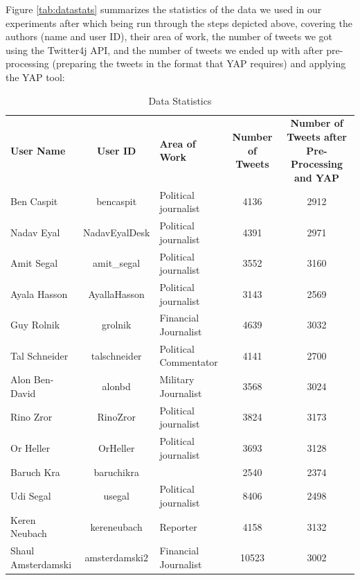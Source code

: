 \documentclass[a4paper]{article}
\begin{document}
Figure \ref{tab:datastats} summarizes the statistics of the data we used in our experiments after which being run through the steps depicted above, covering the authors (name and user ID), their area of work, the number of tweets we got using the Twitter4j API, and the number of tweets we ended up with after pre-processing (preparing the tweets in the format that YAP requires) and applying the YAP tool:\\
\begin{table}[htbp]
  \centering
  \caption{Data Statistics}
    \begin{tabular}{lcp{5.715em}cc}
    \textbf{User Name} & \multicolumn{1}{p{7.57em}}{\textbf{User ID}} & \textbf{Area of Work} & \multicolumn{1}{p{5.57em}}{\textbf{Number of Tweets}} & \multicolumn{1}{p{12.855em}}{\textbf{Number of Tweets after Pre-Processing and YAP}} \\
    Ben Caspit & \multicolumn{1}{p{7.57em}}{bencaspit} & Political journalist & 4136  & 2912 \\
    Nadav Eyal & \multicolumn{1}{p{7.57em}}{NadavEyalDesk} & Political journalist & 4391  & 2971 \\
    Amit Segal & \multicolumn{1}{p{7.57em}}{amit\_segal} & Political journalist & 3552  & 3160 \\
    Ayala Hasson & \multicolumn{1}{p{7.57em}}{AyallaHasson} & Political journalist & 3143  & 2569 \\
    Guy Rolnik & \multicolumn{1}{p{7.57em}}{grolnik} & Financial Journalist & 4639  & 3032 \\
    Tal Schneider & \multicolumn{1}{p{7.57em}}{talschneider} & Political Commentator & 4141  & 2700 \\
    Alon Ben-David & \multicolumn{1}{p{7.57em}}{alonbd} & Military Journalist & 3568  & 3024 \\
    Rino Zror & \multicolumn{1}{p{7.57em}}{RinoZror} & Political journalist & 3824  & 3173 \\
    Or Heller & \multicolumn{1}{p{7.57em}}{OrHeller} & Political journalist & 3693  & 3128 \\
    Baruch Kra & \multicolumn{1}{p{7.57em}}{baruchikra} & \multicolumn{1}{r}{} & 2540  & 2374 \\
    Udi Segal & \multicolumn{1}{p{7.57em}}{usegal} & Political journalist & 8406  & 2498 \\
    Keren Neubach & \multicolumn{1}{p{7.57em}}{kereneubach} & Reporter & 4158  & 3132 \\
    Shaul Amsterdamski & \multicolumn{1}{p{7.57em}}{amsterdamski2} & Financial Journalist & 10523 & 3002 \\

\end{tabular}
\end{table}
\end{document}

